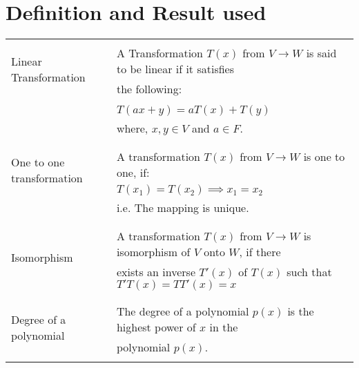 \documentclass[journal,12pt,twocolumn]{IEEEtran}
\begin{document}
\section{Definition and Result used}
\begin{table}[h!]
	\begin{longtable}{|l|l|}
		\hline
		\multirow{3}{*}{Linear Transformation} 
		& \\
		& A Transformation $T(x)$ from $V \rightarrow W$ is said to be linear if it satisfies \\
		&the following:\\
		&\\
		& \qquad $T(ax+y)=aT(x)+T(y)$ \\
		& \qquad where, $x, y \in V$ and $a \in F$.\\
		& \\
		\hline
		\multirow{3}{*}{One to one transformation} & \\
		& A transformation $T(x)$ from $V\rightarrow W$ is one to one, if: \\
		& \qquad $T(x_1)=T(x_2) \implies x_1=x_2$ \\
	    & i.e. The mapping is unique.\\
	    & \\
	    \hline
	    \multirow{3}{*}{Isomorphism} & \\
		& A transformation $T(x)$ from $V\rightarrow W$ is isomorphism of $V$ onto $W$, if there \\
		& exists an inverse $T'(x)$ of $T(x)$ such that $T'T(x)=TT'(x)=x$\\
	    & \\
	    \hline
	    \multirow{3}{*}{Degree of  a polynomial} & \\
		& The degree of a polynomial $p(x)$ is the highest power of $x$ in the \\
	    & polynomial $p(x)$.\\
	    &\\
	    \hline
	\end{longtable}
\end{table}
\end{document}
